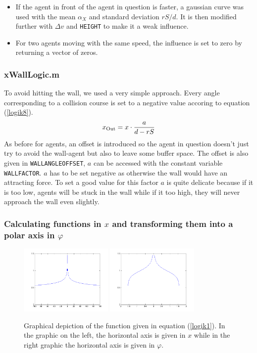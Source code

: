 \begin{itemize}
	\item If the agent in front of the agent in question is faster, a gaussian curve was used with the mean $\alpha_X$ and standard deviation $rS/d$. It is then modified further with $\Delta v$ and \texttt{HEIGHT} to make it a weak influence.
	\item For two agents moving with the same speed, the influence is set to zero by returning a vector of zeros.
\end{itemize}


\subsubsection{xWallLogic.m}
To avoid hitting the wall, we used a very simple approach. Every angle corresponding to a collision course is set to a negative value accoring to equation (\ref{logik8}).
\begin{equation}\label{logik8}
	x_{\text{Out}} = x \cdot \frac{a}{d - rS}
\end{equation}
\noi As before for agents, an offset is introduced so the agent in question doesn't just try to avoid the wall-agent but also to leave some buffer space. The offset is also given in \texttt{WALLANGLEOFFSET}, $a$ can be accessed with the constant variable \texttt{WALLFACTOR}. $a$ has to be set negative as otherwise the wall would have an attracting force. To set a good value for this factor $a$ is quite delicate because if it is too low, agents will be stuck in the wall while if it too high, they will never approach the wall even slightly. 

\subsubsection{Calculating functions in $x$ and transforming them into a polar axis in $\varphi$}
\begin{figure}[h!]
	\centering
		\includegraphics[width=0.40\textwidth]{pictures/Bsp2}
		\includegraphics[width=0.40\textwidth]{pictures/Bsp2Angle}
	\caption{Graphical depiction of the function given in equation (\ref{logik1}). In the graphic on the left, the horizontal axis is given in $x$ while in the right graphic the horizontal axis is given in $\varphi$.}
	\label{fig:Bsp2}
\end{figure}


